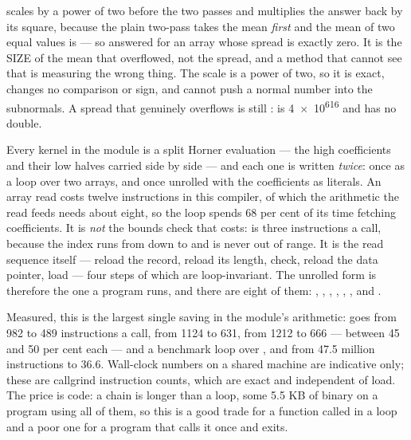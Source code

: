 \begin{description}[style=nextline,leftmargin=5.2em]
   scales by a power of two before the two passes and multiplies
  the answer back by its square, because the plain two-pass takes the mean
  \emph{first} and the mean of two equal  values is  --- so
   answered  for an array whose spread is
  exactly zero. It is the SIZE of the mean that overflowed, not the spread, and
  a method that cannot see that is measuring the wrong thing. The scale is a
  power of two, so it is exact, changes no comparison or sign, and cannot push a
  normal number into the subnormals. A spread that genuinely overflows is still
  :  is \num{4e616} and has no double.
\item[\textnormal{(the polynomial kernels)}] Every kernel in the module is a
  split Horner evaluation --- the high coefficients and their low halves carried
  side by side --- and each one is written \emph{twice}: once as a loop over two
  arrays, and once unrolled with the coefficients as literals. An array read
  costs twelve instructions in this compiler, of which the arithmetic the read
  feeds needs about eight, so the loop spends \num{68} per cent of its time
  fetching coefficients. It is \emph{not} the bounds check that costs:
   is three instructions a call, because the index runs from
   down to  and is never out of range. It is the read sequence
  itself --- reload the record, reload its length, check, reload the data
  pointer, load --- four steps of which are loop-invariant. The unrolled form is
  therefore the one a program runs, and there are eight of them: ,
  , , , , ,  and .

  Measured, this is the largest single saving in the module's arithmetic:
   goes from \num{982} to \num{489} instructions a call, 
  from \num{1124} to \num{631},  from \num{1212} to \num{666} ---
  between \num{45} and \num{50} per cent each --- and a benchmark loop over
  ,  and  from \num{47.5} million instructions to
  \num{36.6}. Wall-clock numbers on a shared machine are indicative only; these
  are callgrind instruction counts, which are exact and independent of load. The
  price is code: a chain is longer than a loop, some \num{5.5} KB of binary on a
  program using all of them, so this is a good trade for a function called in a
  loop and a poor one for a program that calls it once and exits.


\end{description}
